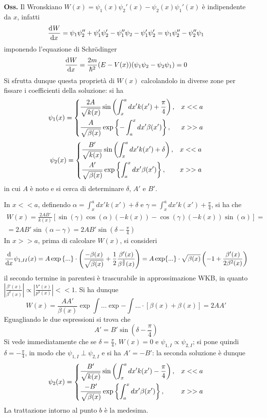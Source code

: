 \textbf{Oss.} Il Wronskiano $W(x)=\psi_1(x)\psi_2'(x)-\psi_2(x)\psi_1'(x)$ è indipendente
da $x$, infatti
$$\dv[]{W}{x} = \psi_1\psi_2''+\psi_1'\psi_2'-\psi_1''\psi_2-\psi_1'\psi_2' = 
\psi_1\psi_2''-\psi_2''\psi_1$$
imponendo l'equazione di Schrödinger
$$\dv[]{W}{x} = \frac{2m}{\hbar^2}(E-V(x))(\psi_1\psi_2-\psi_2\psi_1) = 0$$
Si sfrutta dunque questa proprietà di $W(x)$ calcolandolo in diverse zone per fissare i coefficienti
della soluzione: si ha
$$
\psi_1(x) = 
\begin{dcases}
    \frac{2A}{\sqrt{k(x)}}\sin\left(\int_{x}^{a}dx'k(x')+\frac{\pi}{4}\right),&x<<a\\
    \frac{A}{\sqrt{\beta(x)}}\exp\left\{-\int_{a}^{x}dx'\beta(x')\right\},&x>>a
\end{dcases}
$$
$$
\psi_2(x)=
\begin{dcases}
    \frac{B'}{\sqrt{k(x)}}\sin\left(\int_{x}^{a}dx'k(x')+\delta\right),&x<<a\\
    \frac{A'}{\sqrt{\beta(x)}}\exp\left\{\int_{a}^{x}dx'\beta(x')\right\},&x>>a
\end{dcases}
$$
in cui $A$ è noto e si cerca di determinare $\delta$, $A'$ e $B'$.

In $x<<a$, definendo $\alpha=\int_{x}^{a}dx'k(x')+\delta$ e
$\gamma=\int_{x}^{a}dx'k(x')+\frac{\pi}{4}$, si ha che
\begin{gather*}
W(x)= \frac{2AB'}{k(x)}\left[\sin(\gamma)\cos(\alpha)(-k(x))-\cos(\gamma)(-k(x))\sin(\alpha)\right]=\\
=2AB'\sin(\alpha-\gamma)=2AB'\sin\left(\delta-\frac{\pi}{4}\right)
\end{gather*}
In $x>>a$, prima di calcolare $W(x)$, si consideri
$$\dv[]{}{x}\psi_{1,II}(x) = A\exp\left\{...\right\}\cdot
\left(\frac{-\beta(x)}{\sqrt{\beta(x)}}+\frac{1}{2}\frac{\beta'(x)}{\beta^{\frac{3}{2}}(x)}\right)=
A\exp{...}\cdot\sqrt{\beta(x)}\left(-1+\frac{\beta'(x)}{2\beta^2(x)}\right)
$$
il secondo termine in parentesi è trascurabile in approssimazione WKB, in quanto\\
$\left|\frac{\beta'(x)}{\beta^2(x)}\right|\propto\left|\frac{V'(x)}{p^3(x)}\right|<<1$. Si ha dunque
$$W(x) = \frac{AA'}{\beta(x)}\exp{\int...}\exp{-\int...}\cdot[\beta(x)+\beta(x)] = 2AA'$$
Eguagliando le due espressioni si trova che
$$A'=B'\sin\left(\delta-\frac{\pi}{4}\right)$$
Si vede immediatamente che se $\delta=\frac{\pi}{4}$, $W(x)=0$ e $\psi_{1,I}\propto \psi_{2,I}$; si
pone quindi $\delta=-\frac{\pi}{4}$, in modo che $\psi_{1,I}\perp\psi_{2,I}$ e si ha $A'=-B'$:
la seconda soluzione è dunque
$$\psi_2(x)=
\begin{dcases}
    \frac{B'}{\sqrt{k(x)}}\sin\left(\int_{x}^{a}dx'k(x')-\frac{\pi}{4}\right),&x<<a\\
    \frac{-B'}{\sqrt{\beta(x)}}\exp\left\{\int_{a}^{x}dx'\beta(x')\right\},&x>>a
\end{dcases}
$$
La trattazione intorno al punto $b$ è la medesima.

